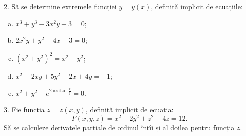 \vspace{0.5cm}

2. Să se determine extremele funcției $ y = y(x) $, definită implicit
de ecuațiile:
\begin{enumerate}[(a)]
\item $ x^3 + y^3 - 3x^2y - 3 = 0 $;
\item $ 2x^2y + y^2 - 4x - 3 = 0 $;
\item $ (x^2 + y^2)^2 = x^2 - y^2 $;
\item $ x^2 - 2xy + 5y^2 - 2x + 4y = - 1 $;
\item $ x^2 + y^2 - e^{2 \arctan \frac{x}{y}} = 0 $.
\end{enumerate}

\vspace{0.5cm}

3. Fie funcția $ z = z(x, y) $, definită implicit de ecuația:
\[
  F(x, y, z) = x^2 + 2y^2 + z^2 - 4z = 12.
\]
Să se calculeze derivatele parțiale de ordinul întîi și al doilea
pentru funcția $ z $.


